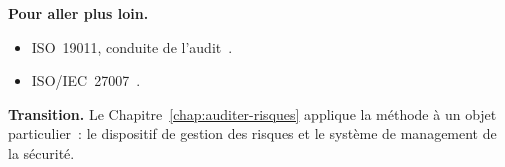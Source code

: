 \bigskip

\begin{boxinfo}
\textbf{Pour aller plus loin.}
\begin{itemize}
    \item ISO~19011, conduite de l'audit~\cite{iso19011_2018}.
    \item ISO/IEC~27007~\cite{iso27007_2020}.
\end{itemize}
\end{boxinfo}

\begin{boxinfo}
\textbf{Transition.} Le Chapitre~\ref{chap:auditer-risques} applique la
méthode à un objet particulier~: le dispositif de gestion des risques et
le système de management de la sécurité.
\end{boxinfo}
